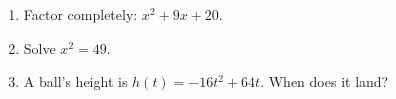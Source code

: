 \begin{practicebox}
\begin{enumerate}
  \item Factor completely: $x^2+9x+20$. \hfill \blank{4cm}
  \item Solve $x^2=49$. \hfill \blank{4cm}
  \item A ball's height is $h(t)=-16t^2+64t$. When does it land? \hfill \blank{3cm}
\end{enumerate}
\end{practicebox}
